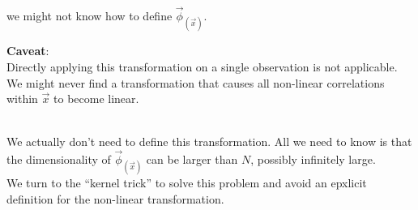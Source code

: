 \begin{frame}
{
}

\end{frame}

\begin{frame}\frametitle{\secname}

\pause
{} we might not know how to define $\vec \phi_{(\vec x)}$.

\pause

\svspace{5mm}

\textbf{Caveat}:\\
Directly applying this transformation on a single observation is not applicable. 
We might never find a transformation that causes all non-linear correlations within $\vec x$ to become linear.\\

\pause

\svspace{5mm}

\\

We actually don't need to define this transformation.
All we need to know is that the dimensionality of $\vec{\phi}_{(\vec{x})}$ can be larger than $N$, possibly infinitely large.\\

We turn to the ``kernel trick'' to solve this problem and avoid an epxlicit definition for the non-linear transformation.

\end{frame}

